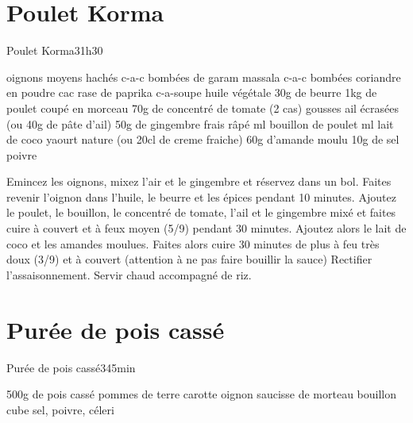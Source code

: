 {\section{Poulet Korma}
\begin{recette}{Poulet Korma}{3}{1h30}{}
\begin{ingredients}
\ingredient[etape 1]
 oignons moyens hachés
 c-a-c bombées de garam massala %
 c-a-c bombées coriandre en poudre
 cac rase de paprika
 c-a-soupe huile végétale
\ingredient 30g de beurre
\ingredient[etape 2]
\ingredient 1kg de poulet coupé en morceau
\ingredient 70g de concentré de tomate (2 cas)
 gousses ail écrasées (ou 40g de pâte d'ail)
\ingredient 50g de gingembre frais râpé %
 ml bouillon de poulet
\ingredient[etape 3]
 ml lait de coco
 yaourt nature (ou 20cl de creme fraiche) %
\ingredient 60g d'amande moulu
\ingredient 10g de sel
\ingredient poivre
\end{ingredients}

\begin{preparation}
\etape Emincez les oignons, mixez l'air et le gingembre et réservez dans un bol.
\etape Faites revenir l'oignon dans l'huile, le beurre et les épices pendant 10 minutes. 
\etape Ajoutez le poulet, le bouillon, le concentré de tomate, l'ail et le gingembre mixé et faites cuire à couvert et à feux moyen (5/9) pendant 30 minutes.
\etape Ajoutez alors le lait de coco et les amandes moulues. Faites alors cuire 30 minutes de plus à feu très doux (3/9) et à couvert (attention à ne pas faire bouillir la sauce) Rectifier l'assaisonnement.
\etape Servir chaud accompagné de riz.
\end{preparation}
\end{recette}

\section{Purée de pois cassé}
\begin{recette}{Purée de pois cassé}{3}{45min}{}

\begin{ingredients}
\ingredient 500g de pois cassé
 pommes de terre
 carotte
 oignon
 saucisse de morteau
 bouillon cube
\ingredient sel, poivre, céleri
\end{ingredients}


\end{recette}}
